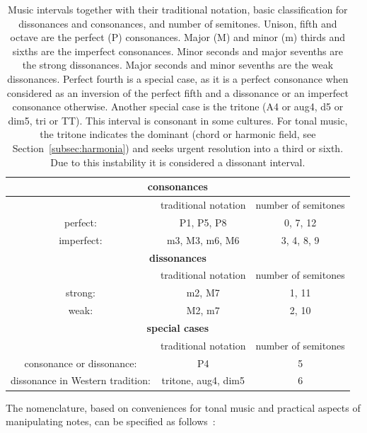 \begin{table}[htp!]
\centering
\caption{Music intervals together with their traditional notation, basic classification for dissonances and consonances, and number of semitones. Unison, fifth and octave are the perfect (P) consonances. Major (M) and minor (m) thirds and sixths are the imperfect consonances.
	Minor seconds and major sevenths are the strong dissonances.
	Major seconds and minor sevenths are the weak dissonances.
	Perfect fourth is a special case, as it is a perfect consonance when considered as an inversion of the perfect fifth and a dissonance or an imperfect consonance otherwise.
	Another special case is the tritone (A4 or aug4, d5 or dim5, tri or TT).
	This interval is consonant in some cultures.
	For tonal music, the tritone indicates the dominant (chord or harmonic field, see Section~\ref{subsec:harmonia}) and seeks urgent resolution into a third or sixth. Due to this instability it is considered a dissonant interval.}
\begin{tabular}{ c | c | c }\hline
    \multicolumn{3}{c}{\bf consonances}  \\\hline
   & traditional notation & number of semitones \\
   perfect: & P1, P5, P8 & 0, 7, 12 \\
 imperfect: & m3, M3, m6, M6 & 3, 4, 8, 9 \\\hline\hline
    \multicolumn{3}{c}{\bf dissonances} \\\hline
 & traditional notation & number of semitones \\
 strong: & m2, M7 & 1, 11 \\
 weak: & M2, m7 & 2, 10 \\\hline\hline
    \multicolumn{3}{c}{\bf special cases} \\\hline
 & traditional notation & number of semitones \\
 consonance or dissonance: & P4 & 5 \\
 dissonance in Western tradition: & tritone, aug4, dim5 & 6 \\\hline
\end{tabular}\label{eq:intervalos}
\end{table}

The nomenclature, based on conveniences for tonal music and practical aspects of manipulating notes, can be specified
as follows~\cite{Roederer,Wisnick}:

